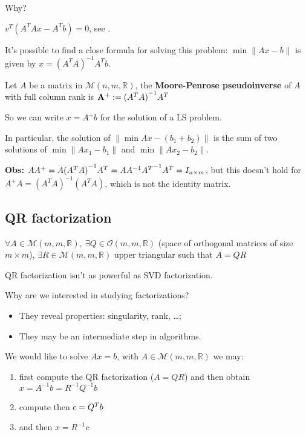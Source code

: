 \documentclass[computational_mathematics.tex]{subfiles}
\begin{document}
Why?

$v^T({A}^{T}Ax - {A}^{T}b) = 0$, see .


It's possible to find a close formula for solving this problem: $\min\|Ax-b\|$ is given by $x={({A}^{T}A)}^{-1}{A}^{T}b$.

\begin{definition}
  Let $A$ be a matrix in $\mathcal{M}(n, m, \mathds{R})$, the \textbf{Moore-Penrose pseudoinverse} of $A$ with full column rank is ${\bf {A}^{+}} := {({A}^{T}A)}^{-1}{A}^{T}$
\end{definition}

So we can write $x={A}^{+}b$ for the solution of a LS problem.

In particular, the solution of $\|\min Ax - ({b}_{1} + {b}_{2})\|$ is the sum of two solutions of $\min \| A{x}_{1} -b_{1} \|$ and  $\min \| A{x}_{2} -b_{2} \|$.

\textbf{Obs:} $A{A}^{+} = A {({A}^{T}A)}^{-1} {A}^{T} = A {A}^{-1} {{A}^{T}}^{-1} {A}^{T} = I_{n \times m}$, but this doesn't hold for ${A}^{+}A = {({A}^{T}A)}^{-1}({A}^{T}A)$, which is not the identity matrix.

\subsection{QR factorization}

\begin{theorem}
  $\forall A \in \mathcal{M}(m, m, \mathds{R}),~ \exists  Q \in \mathcal{O}(m, m, \mathds{R})$ (space of orthogonal matrices of size $m\times m$), $\exists R \in \mathcal{M}(m, m, \mathds{R})$ upper triangular such that $A=QR$
\end{theorem}

QR factorization isn't as powerful as SVD factorization.

Why are we interested in studying factorizations?

\begin{itemize}
  \item They reveal properties: singularity, rank, \dots;
  \item They may be an intermediate step in algorithms.
\end{itemize}

\begin{example}
  We would like to solve $Ax=b$, with $A \in \mathcal{M}(m, m, \mathds{R})$ we may:

\begin{enumerate}
  \item first compute the QR factorization ($A=QR$) and then obtain 
$x={A}^{-1}b={R}^{-1}{Q}^{-1}b$
  \item compute then $c= {Q}^{T}b$
  \item and then $x={R}^{-1}c$
\end{enumerate}
\end{example}
\end{document}
